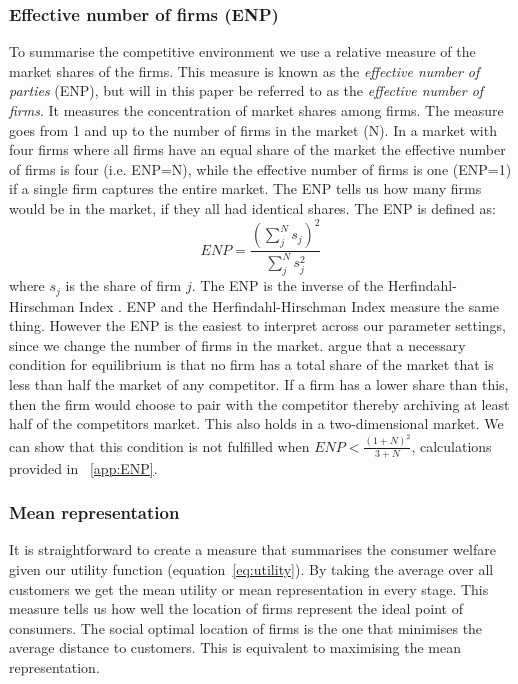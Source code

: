 \documentclass[preprint, 12pt]{elsarticle}
\begin{document}
\subsubsection*{Effective number of firms (ENP)}
To summarise the competitive environment we use a relative measure of the market shares of the firms. This measure is known as the \emph{effective number of parties} (ENP), but will in this paper be referred to as the \emph{effective number of firms}. It measures the concentration of market shares among firms. The measure goes from 1 and up to the number of firms in the market (N). In a market with four firms where all firms have an equal share of the market the effective number of firms is four (i.e. ENP=N), while the effective number of firms is one (ENP=1) if a single firm captures the entire market. The ENP tells us how many firms would be in the market, if they all had identical shares. The ENP is defined as:
\begin{equation}
ENP = \frac{{\left( \sum\limits_j^N s_j \right)^2}}{{\sum\limits_j^N s_j^2 }}
\label{eq:enp}
\end{equation}
where $s_j$ is the share of firm $j$. The ENP is the inverse of the Herfindahl-Hirschman Index \citep[p.~4]{Laakso_Taagepera_1979}. ENP and the Herfindahl-Hirschman Index measure the same thing. However the ENP is the easiest to interpret across our parameter settings, since we change the number of firms in the market. \citet{Eaton_Lipsey_1975} argue that a necessary condition for equilibrium is that no firm has a total share of the market that is less than half the market of any competitor. If a firm has a lower share than this, then the firm would choose to pair with the competitor thereby archiving at least half of the competitors market. This also holds in a two-dimensional market. We can show that this condition is not fulfilled when $ENP < \frac{(1+N)^2}{3+N}$, calculations provided in ~\ref{app:ENP}.

\subsubsection*{Mean representation}
It is straightforward to create a measure that summarises the consumer welfare given our utility function (equation~\ref{eq:utility}). By taking the average over all customers we get the mean utility or mean representation in every stage. This measure tells us how well the location of firms represent the ideal point of consumers. The social optimal location of firms is the one that minimises the average distance to customers. This is equivalent to maximising the mean representation.
\end{document}
